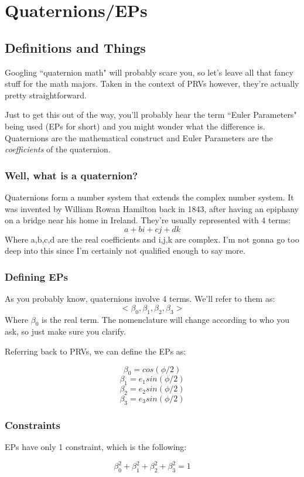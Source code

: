 \documentclass[a4paper,14pt]{extreport}
\begin{document}
\chapter{Quaternions/EPs}
\section{Definitions and Things}
Googling ``quaternion math" will probably scare you, so let's leave all that fancy stuff for the math majors. Taken in the context of PRVs however, they're actually pretty straightforward.

Just to get this out of the way, you'll probably hear the term ``Euler Parameters" being used (EPs for short) and you might wonder what the difference is. Quaternions are the mathematical construct and Euler Parameters are the \emph{coefficients} of the quaternion.\\
 
\subsection{Well, what is a quaternion?}
Quaternions form a number system that extends the complex number system. It was invented by William Rowan Hamilton back in 1843, after having an epiphany on a bridge near his home in Ireland. They're usually represented with 4 terms:
\[
a + bi + cj + dk
\]
Where a,b,c,d are the real coefficients and i,j,k are complex. I'm not gonna go too deep into this since I'm certainly not qualified enough to say more.

\subsection{Defining EPs}
As you probably know, quaternions involve 4 terms. We'll refer to them as:
\[<\beta_0,\beta_1,\beta_2,\beta_3>\]
Where $\beta_0$ is the real term. The nomenclature will change according to who you ask, so just make sure you clarify.

Referring back to PRVs, we can define the EPs as:

\[\beta_0 = cos(\phi/2)\]
\[\beta_1 = e_1 sin(\phi/2)\]
\[\beta_2 = e_2 sin(\phi/2)\]
\[\beta_3 = e_3 sin(\phi/2)\]

\subsection{Constraints}
EPs have only 1 constraint, which is the following:\

\[\beta_0^2+\beta_1^2+\beta_2^2+\beta_3^2=1\]
\end{document}
